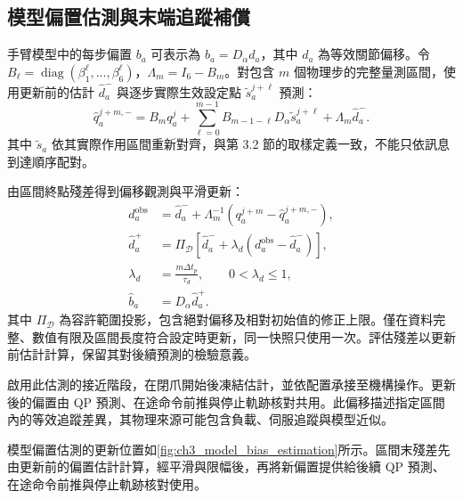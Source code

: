 \subsection{模型偏置估測與末端追蹤補償}
\label{subsec:model_bias_tcp_compensation}

手臂模型中的每步偏置 $b_a$ 可表示為 $b_a=D_\alpha d_a$，其中 $d_a$ 為等效關節偏移。令 $B_\ell=\operatorname{diag}(\beta_1^\ell,\ldots,\beta_6^\ell)$，$\Lambda_m=I_6-B_m$。對包含 $m$ 個物理步的完整量測區間，使用更新前的估計 $\hat d_a^{-}$ 與逐步實際生效設定點 $\tilde s_a^{j+\ell}$ 預測：
\begin{equation}
    \hat q_a^{j+m,-}
    =B_m q_a^j
     +\sum_{\ell=0}^{m-1}
       B_{m-1-\ell}D_\alpha\tilde s_a^{j+\ell}
     +\Lambda_m\hat d_a^{-}.
    \label{eq:ch3_interval_offset_prediction}
\end{equation}
其中 $\tilde s_a$ 依其實際作用區間重新對齊，與第 3.2 節的取樣定義一致，不能只依訊息到達順序配對。

由區間終點殘差得到偏移觀測與平滑更新：
\begin{equation}
    \begin{aligned}
        d_a^{\mathrm{obs}}
        &=\hat d_a^{-}
          +\Lambda_m^{-1}
            (q_a^{j+m}-\hat q_a^{j+m,-}),\\
        \hat d_a^{+}
        &=\Pi_{\mathcal D}
          \left[
             \hat d_a^{-}
             +\lambda_d(d_a^{\mathrm{obs}}-\hat d_a^{-})
          \right],\\
        \lambda_d&=\frac{m\Delta t_p}{\tau_d},
        \qquad 0<\lambda_d\leq1,\\
        \hat b_a&=D_\alpha\hat d_a^{+}.
    \end{aligned}
    \label{eq:ch3_interval_offset_update}
\end{equation}
其中 $\Pi_{\mathcal D}$ 為容許範圍投影，包含絕對偏移及相對初始值的修正上限。僅在資料完整、數值有限及區間長度符合設定時更新，同一快照只使用一次。評估殘差以更新前估計計算，保留其對後續預測的檢驗意義。

啟用此估測的接近階段，在閉爪開始後凍結估計，並依配置承接至機構操作。更新後的偏置由 QP 預測、在途命令前推與停止軌跡核對共用。此偏移描述指定區間內的等效追蹤差異，其物理來源可能包含負載、伺服追蹤與模型近似。

模型偏置估測的更新位置如\cref{fig:ch3_model_bias_estimation}所示。區間末殘差先由更新前的偏置估計計算，經平滑與限幅後，再將新偏置提供給後續 QP 預測、在途命令前推與停止軌跡核對使用。

